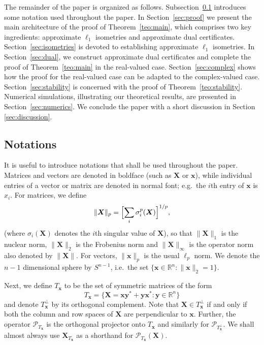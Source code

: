 \documentclass[11pt]{article}
\newcommand{\R}{\mathbb{R}}
\newcommand{\<}{\langle}
\renewcommand{\>}{\rangle}
\newcommand{\bx}{\bm{x}}
\newcommand{\bX}{\bm{X}}
\newcommand{\by}{\bm{y}}
\numberwithin{equation}{section}
\begin{document}
The remainder of the paper is organized as follows.
Subsection~\ref{subsec:notation} introduces some notation used
throughout the paper. In Section~\ref{sec:proof} we present the main
architecture of the proof of Theorem~\ref{teo:main}, which comprises
two key ingredients: approximate $\ell_1$ isometries and approximate
dual certificates.  Section~\ref{sec:isometries} is devoted to
establishing approximate $\ell_1$ isometries. In
Section~\ref{sec:dual}, we construct approximate dual certificates and
complete the proof of Theorem~\ref{teo:main} in the real-valued
case. Section~\ref{sec:complex} shows how the proof for the
real-valued case can be adapted to the complex-valued
case. Section~\ref{sec:stability} is concerned with the proof of
Theorem~\ref{teo:stability}. Numerical simulations, illustrating our
theoretical results, are presented in Section~\ref{sec:numerics}. We
conclude the paper with a short discussion in Section
\ref{sec:discussion}.


\subsection{Notations}
\label{subsec:notation}

\newcommand{\Tp}{T^\perp}
\newcommand{\PT}{\mathcal{P}_T}
\newcommand{\PTp}{\mathcal{P}_{T^\perp}}

It is useful to introduce notations that shall be used throughout the
paper. Matrices and vectors are denoted in boldface (such as $\bX$ or
$\bx$), while individual entries of a vector or matrix are denoted in
normal font; e.g.\ the $i$th entry of $\bx$ is $x_i$.  For matrices,
we define
\[
\|\bX\|_p = \Bigl[\sum_i \sigma_i^p(\bX)\Bigr]^{1/p},
\]
(where $\sigma_i(\bX)$ denotes the $i$th singular value of $\bX$), so that
$\|\bX\|_1$ is the nuclear norm, $\|\bX\|_2$ is the Frobenius norm
and $\|\bX\|_\infty$ is the operator norm also denoted by $\|\bX\|$. For
vectors, $\|\bx\|_p$ is the usual $\ell_p$ norm. We denote the $n-1$
dimensional sphere by $S^{n-1}$, i.e.~the set $\{\bx \in \R^n : \|\bx\|_2
= 1\}$.

Next, we define $T_{\bx}$ to be the set of symmetric matrices of the
form
\begin{equation}
\label{eq:T}
T_{\bx} = \{\bX = \bx \by^* + \by \bx^*: \by \in \R^n\} 
\end{equation}
and denote $T_{\bx}^\perp$ by its orthogonal complement.  Note that
$\bX \in T_{\bx}^\perp$ if and only if both the column and row spaces
of $\bX$ are perpendicular to $\bx$. Further, the operator
$\mathcal{P}_{T_{\bx}}$ is the orthogonal projector onto $T_{\bx}$ and
similarly for $\mathcal{P}_{T_{\bx}^\perp}$. We shall almost always
use $\bX_{T_{\bx}}$ as a shorthand for $\mathcal{P}_{T_{\bx}}(\bX)$.
\end{document}
